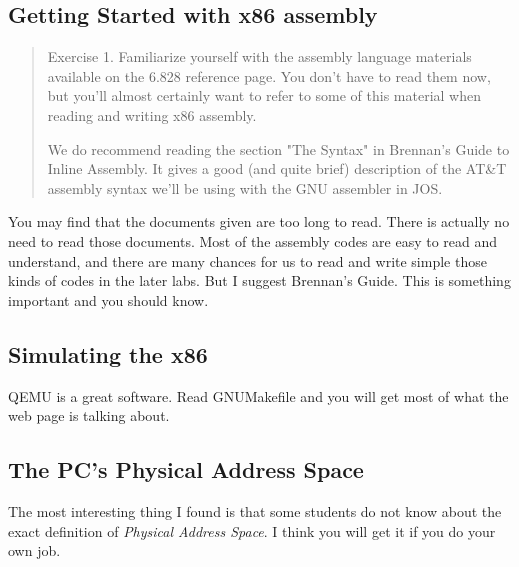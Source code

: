 \documentclass[10pt]{article}
\begin{document}
	\subsection{Getting Started with x86 assembly}
		\begin{quote}\begin{colorboxed}
		Exercise 1. Familiarize yourself with the assembly language materials available on the 6.828 reference page. You don't have to read them now, but you'll almost certainly want to refer to some of this material when reading and writing x86 assembly.

		We do recommend reading the section "The Syntax" in Brennan's Guide to Inline Assembly. It gives a good (and quite brief) description of the AT\&T assembly syntax we'll be using with the GNU assembler in JOS. 
		\end{colorboxed}\end{quote}
		\begin{flushleft}
		You may find that the documents given are too long to read. There is actually no need to read those documents. Most of the assembly codes are easy to read and understand, and there are many chances for us to read and write simple those kinds of codes in the later labs.
		But I suggest Brennan's Guide. This is something important and you should know.
		\end{flushleft}

	\subsection{Simulating the x86}
		\begin{flushleft}
		QEMU is a great software. Read GNUMakefile and you will get most of what the web page is talking about.
		\end{flushleft}

	\subsection{The PC's Physical Address Space}
		\begin{flushleft}
		The most interesting thing I found is that some students do not know about the exact definition of \emph{Physical Address Space}. I think you will get it if you do your own job.
		\end{flushleft}
\end{document}
